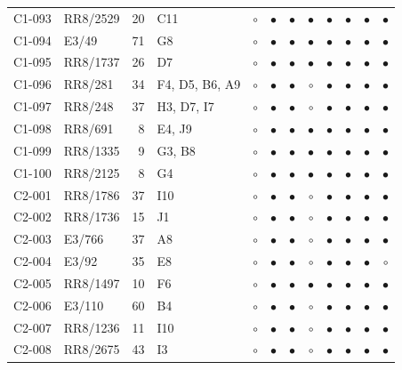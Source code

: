 {\begin{longtable}{llrp{3.9cm}cccccccc}
    C1-093 & RR8/2529 & 20 & C11 & $\circ$ & $\bullet$ & $\bullet$ & $\bullet$ & $\bullet$ & $\bullet$ & $\bullet$ & $\bullet$ \\
    C1-094 & E3/49 & 71 & G8 & $\circ$ & $\bullet$ & $\bullet$ & $\bullet$ & $\bullet$ & $\bullet$ & $\bullet$ & $\bullet$ \\
    C1-095 & RR8/1737 & 26 & D7 & $\circ$ & $\bullet$ & $\bullet$ & $\bullet$ & $\bullet$ & $\bullet$ & $\bullet$ & $\bullet$ \\
    C1-096 & RR8/281 & 34 & F4, D5, B6, A9 & $\circ$ & $\bullet$ & $\bullet$ & $\circ$ & $\bullet$ & $\bullet$ & $\bullet$ & $\bullet$ \\
    C1-097 & RR8/248 & 37 & H3, D7, I7 & $\circ$ & $\bullet$ & $\bullet$ & $\circ$ & $\bullet$ & $\bullet$ & $\bullet$ & $\bullet$ \\
    C1-098 & RR8/691 & 8 & E4, J9 & $\circ$ & $\bullet$ & $\bullet$ & $\bullet$ & $\bullet$ & $\bullet$ & $\bullet$ & $\bullet$ \\
    C1-099 & RR8/1335 & 9 & G3, B8 & $\circ$ & $\bullet$ & $\bullet$ & $\bullet$ & $\bullet$ & $\bullet$ & $\bullet$ & $\bullet$ \\
    C1-100 & RR8/2125 & 8 & G4 & $\circ$ & $\bullet$ & $\bullet$ & $\bullet$ & $\bullet$ & $\bullet$ & $\bullet$ & $\bullet$ \\
    C2-001 & RR8/1786 & 37 & I10 & $\circ$ & $\bullet$ & $\bullet$ & $\circ$ & $\bullet$ & $\bullet$ & $\bullet$ & $\bullet$ \\
    C2-002 & RR8/1736 & 15 & J1 & $\circ$ & $\bullet$ & $\bullet$ & $\circ$ & $\bullet$ & $\bullet$ & $\bullet$ & $\bullet$ \\
    C2-003 & E3/766 & 37 & A8 & $\circ$ & $\bullet$ & $\bullet$ & $\circ$ & $\bullet$ & $\bullet$ & $\bullet$ & $\bullet$ \\
    C2-004 & E3/92 & 35 & E8 & $\circ$ & $\bullet$ & $\bullet$ & $\circ$ & $\bullet$ & $\bullet$ & $\bullet$ & $\circ$ \\
    C2-005 & RR8/1497 & 10 & F6 & $\circ$ & $\bullet$ & $\bullet$ & $\bullet$ & $\bullet$ & $\bullet$ & $\bullet$ & $\bullet$ \\
    C2-006 & E3/110 & 60 & B4 & $\circ$ & $\bullet$ & $\bullet$ & $\circ$ & $\bullet$ & $\bullet$ & $\bullet$ & $\bullet$ \\
    C2-007 & RR8/1236 & 11 & I10 & $\circ$ & $\bullet$ & $\bullet$ & $\circ$ & $\bullet$ & $\bullet$ & $\bullet$ & $\bullet$ \\
    C2-008 & RR8/2675 & 43 & I3 & $\circ$ & $\bullet$ & $\bullet$ & $\circ$ & $\bullet$ & $\bullet$ & $\bullet$ & $\bullet$ \\

\end{longtable}}
